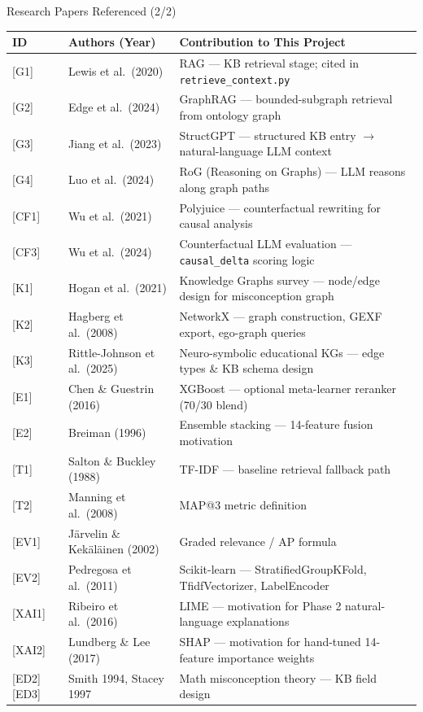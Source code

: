\documentclass[aspectratio=169]{beamer}
\begin{document}
\begin{frame}{Research Papers Referenced (2/2)}
\scriptsize
\setlength{\tabcolsep}{3pt}
\renewcommand{\arraystretch}{1.2}
\begin{tabular}{p{0.6cm}p{3.2cm}p{7.0cm}}
\toprule
\textbf{ID} & \textbf{Authors (Year)} & \textbf{Contribution to This Project}\\
\midrule
\rowcolor{RowTintA}
{[G1]} & Lewis et al.\ (2020) & RAG --- KB retrieval stage; cited in \texttt{retrieve\_context.py}\\
{[G2]} & Edge et al.\ (2024) & GraphRAG --- bounded-subgraph retrieval from ontology graph\\
\rowcolor{RowTintA}
{[G3]} & Jiang et al.\ (2023) & StructGPT --- structured KB entry $\rightarrow$ natural-language LLM context\\
{[G4]} & Luo et al.\ (2024) & RoG (Reasoning on Graphs) --- LLM reasons along graph paths\\
\rowcolor{RowTintA}
{[CF1]} & Wu et al.\ (2021) & Polyjuice --- counterfactual rewriting for causal analysis\\
{[CF3]} & Wu et al.\ (2024) & Counterfactual LLM evaluation --- \texttt{causal\_delta} scoring logic\\
\rowcolor{RowTintA}
{[K1]} & Hogan et al.\ (2021) & Knowledge Graphs survey --- node/edge design for misconception graph\\
{[K2]} & Hagberg et al.\ (2008) & NetworkX --- graph construction, GEXF export, ego-graph queries\\
\rowcolor{RowTintA}
{[K3]} & Rittle-Johnson et al.\ (2025) & Neuro-symbolic educational KGs --- edge types \& KB schema design\\
{[E1]} & Chen \& Guestrin (2016) & XGBoost --- optional meta-learner reranker (70/30 blend)\\
\rowcolor{RowTintA}
{[E2]} & Breiman (1996) & Ensemble stacking --- 14-feature fusion motivation\\
{[T1]} & Salton \& Buckley (1988) & TF-IDF --- baseline retrieval fallback path\\
\rowcolor{RowTintA}
{[T2]} & Manning et al.\ (2008) & MAP@3 metric definition\\
{[EV1]} & J\"arvelin \& Kek\"al\"ainen (2002) & Graded relevance / AP formula\\
\rowcolor{RowTintA}
{[EV2]} & Pedregosa et al.\ (2011) & Scikit-learn --- StratifiedGroupKFold, TfidfVectorizer, LabelEncoder\\
{[XAI1]} & Ribeiro et al.\ (2016) & LIME --- motivation for Phase 2 natural-language explanations\\
\rowcolor{RowTintA}
{[XAI2]} & Lundberg \& Lee (2017) & SHAP --- motivation for hand-tuned 14-feature importance weights\\
{[ED2][ED3]} & Smith 1994, Stacey 1997 & Math misconception theory --- KB field design\\
\bottomrule
\end{tabular}
\end{frame}
\end{document}
